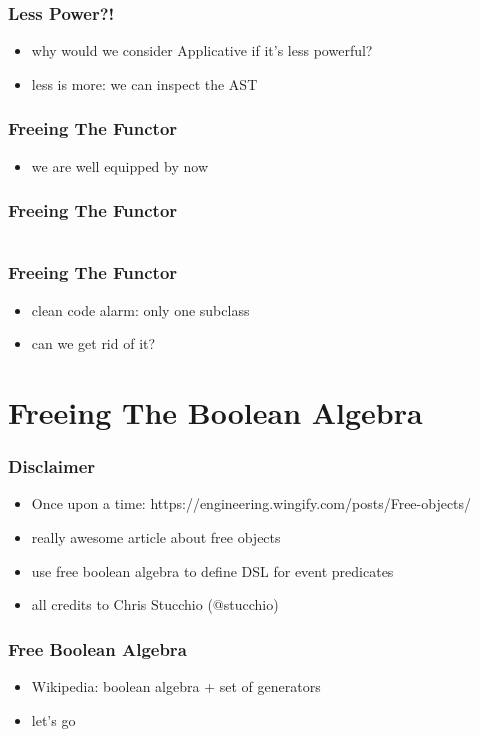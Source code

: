 \documentclass{beamer}
\begin{document}
\begin{frame}
  \frametitle{Less Power?!}
  \begin{itemize}
  \item why would we consider Applicative if it's less powerful?
  \item less is more: we can inspect the AST
  \end{itemize}
\end{frame}

\begin{frame}[fragile]
  \frametitle{Freeing The Functor}
  \begin{itemize}
  \item we are well equipped by now
  \end{itemize}
\end{frame}

\begin{frame}[fragile]
  \frametitle{Freeing The Functor}
  \inputminted{scala}{snippets/free-functor.scala}
\end{frame}

\begin{frame}[fragile]
  \frametitle{Freeing The Functor}
  \begin{itemize}
  \item clean code alarm: only one subclass
  \item can we get rid of it?
  \end{itemize}
\end{frame}

\section{Freeing The Boolean Algebra}\label{sec:free-boolean-algebra}

\begin{frame}
  \frametitle{Disclaimer}
  \begin{itemize}
  \item Once upon a time: https://engineering.wingify.com/posts/Free-objects/
  \item really awesome article about free objects
  \item use free boolean algebra to define DSL for event predicates
  \item all credits to Chris Stucchio (@stucchio)
  \end{itemize}
\end{frame}

\begin{frame}
  \frametitle{Free Boolean Algebra}
  \begin{itemize}
  \item Wikipedia: boolean algebra + set of generators
  \item let's go
  \end{itemize}
\end{frame}
\end{document}

